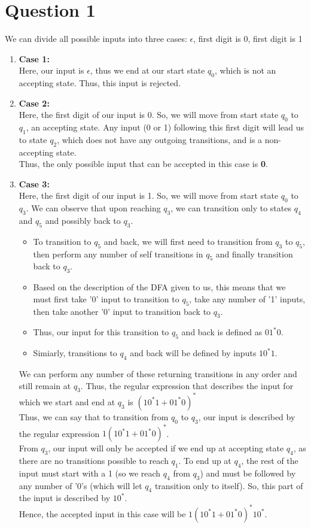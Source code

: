 \documentclass[12pt,a4paper]{article}
\begin{document}
\section{Question 1}
We can divide all possible inputs into three cases: $\epsilon$, first digit is 0, first digit is 1
\begin{enumerate}
\item \textbf{Case 1: }
\\Here, our input is $\epsilon$, thus we end at our start state $q_0$, which is not an accepting state. Thus, this input is rejected.
\item \textbf{Case 2: }
\\Here, the first digit of our input is 0. So, we will move from start state $q_0$ to $q_1$, an accepting state. Any input (0 or 1) following this first digit will lead us to state $q_2$, which does not have any outgoing transitions, and is a non-accepting state. 
\\Thus, the only possible input that can be accepted in this case is \textbf{0}.
\item \textbf{Case 3: }
\\ Here, the first digit of our input is 1. So, we will move from start state $q_0$ to $q_3$. 
We can observe that upon reaching $q_3$, we can transition only to states $q_4$ and $q_5$ and possibly back to $q_3$.
\begin{itemize}
\item To transition to $q_5$ and back, we will first need to transition from $q_3$ to $q_5$, then perform any number of self transitions in $q_5$ and finally transition back to $q_3$.
\item Based on the description of the DFA given to us, this means that we must first take '0' input to transition to $q_5$, take any number of '1' inputs, then take another '0' input to transition back to $q_3$. 
\item Thus, our input for this transition to $q_5$ and back is defined as $01^*0$.
\item Simiarly, transitions to $q_4$ and back will be defined by inputs $10^*1$.
\end{itemize}
We can perform any number of these returning transitions in any order and still remain at $q_3$. Thus, the regular expression that describes the input for which we start and end at $q_3$ is $(10^*1 + 01^*0)^*$
\\Thus, we can say that to transition from $q_0$ to $q_3$, our input is described by the regular expression $1(10^*1 + 01^*0)^*$.
\\From $q_3$, our input will only be accepted if we end up at accepting state $q_4$, as there are no transitions possible to reach $q_1$. To end up at $q_4$, the rest of the input must start with a 1 (so we reach $q_4$ from $q_3$) and must be followed by any number of '0's (which will let $q_4$ transition only to itself). So, this part of the input is described by $10^*$.
\boldmath
\\Hence, the accepted input in this case will be $1(10^*1 + 01^*0)^*10^*$.
\end{enumerate}
\end{document}
